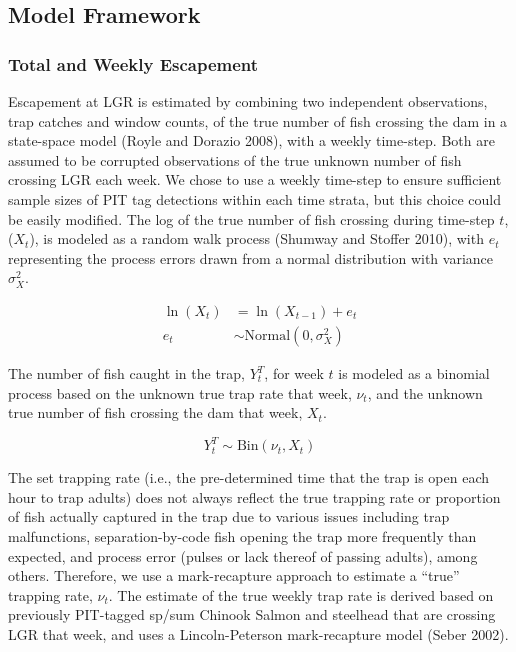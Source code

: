 \documentclass[
  12pt,
]{article}
\begin{document}
\hypertarget{model-framework}{%
\subsection{Model Framework}\label{model-framework}}

\hypertarget{total-and-weekly-escapement}{%
\subsubsection{Total and Weekly Escapement}\label{total-and-weekly-escapement}}

Escapement at LGR is estimated by combining two independent observations, trap catches and window counts, of the true number of fish crossing the dam in a state-space model (Royle and Dorazio 2008), with a weekly time-step. Both are assumed to be corrupted observations of the true unknown number of fish crossing LGR each week. We chose to use a weekly time-step to ensure sufficient sample sizes of PIT tag detections within each time strata, but this choice could be easily modified. The log of the true number of fish crossing during time-step \(t\), (\(X_t\)), is modeled as a random walk process (Shumway and Stoffer 2010), with \(e_t\) representing the process errors drawn from a normal distribution with variance \(\sigma^2_X\).

\begin{equation}
  \begin{aligned}
    \ln \left( X_{t} \right) &= \ln \left( X_{t-1} \right) + e_t \\
    e_t &\sim \text{Normal}(0, \sigma^2_X)
  \end{aligned}
\end{equation}

The number of fish caught in the trap, \(Y^T_t\), for week \(t\) is modeled as a binomial process based on the unknown true trap rate that week, \(\nu_t\), and the unknown true number of fish crossing the dam that week, \(X_t\).

\begin{equation}
  Y^T_t \sim \text{Bin} \left( \nu_t, X_t \right)
\end{equation}

The set trapping rate (i.e., the pre-determined time that the trap is open each hour to trap adults) does not always reflect the true trapping rate or proportion of fish actually captured in the trap due to various issues including trap malfunctions, separation-by-code fish opening the trap more frequently than expected, and process error (pulses or lack thereof of passing adults), among others. Therefore, we use a mark-recapture approach to estimate a ``true'' trapping rate, \(\nu_t\). The estimate of the true weekly trap rate is derived based on previously PIT-tagged sp/sum Chinook Salmon and steelhead that are crossing LGR that week, and uses a Lincoln-Peterson mark-recapture model (Seber 2002).
\end{document}
